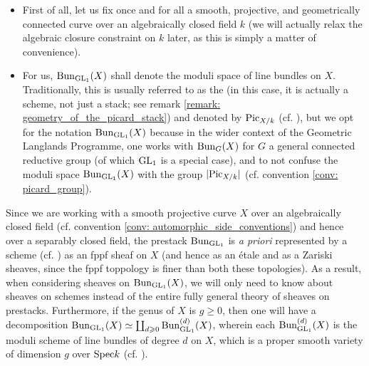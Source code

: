             \begin{convention} \label{conv: automorphic_side_conventions}
                \noindent
                \begin{itemize}
                    \item First of all, let us fix once and for all a smooth, projective, and geometrically connected curve over an algebraically closed field $k$ (we will actually relax the algebraic closure constraint on $k$ later, as this is simply a matter of convenience).
                    \item For us, $\mathrm{Bun}_{\operatorname{GL}_1}(X)$ shall denote the moduli space of line bundles on $X$. Traditionally, this is usually referred to as the  (in this case, it is actually a scheme, not just a stack; see remark \ref{remark: geometry_of_the_picard_stack}) and denoted by $\mathrm{Pic}_{X/k}$ (cf. \cite[\href{https://stacks.math.columbia.edu/tag/0372}{Tag 0372}]{stacks}), but we opt for the notation $\mathrm{Bun}_{\operatorname{GL}_1}(X)$ because in the wider context of the Geometric Langlands Programme, one works with $\mathrm{Bun}_G(X)$ for $G$ a general connected reductive group (of which $\operatorname{GL}_1$ is a special case), and to not confuse the moduli space $\mathrm{Bun}_{\operatorname{GL}_1}(X)$ with the group $|\mathrm{Pic}_{X/k}|$ (cf. convention \ref{conv: picard_group}). 
                \end{itemize}
            \end{convention}
            \begin{remark} \label{remark: geometry_of_the_picard_stack}
                Since we are working with a smooth projective curve $X$ over an algebraically closed field (cf. convention \ref{conv: automorphic_side_conventions}) and hence over a separably closed field, the prestack $\mathrm{Bun}_{\operatorname{GL}_1}$ is \textit{a priori} represented by a scheme (cf. \cite[\href{https://stacks.math.columbia.edu/tag/0B9Z}{Tag 0B9Z}]{stacks}) as an fppf sheaf on $X$ (and hence as an \'etale and as a Zariski sheaves, since the fppf toppology is finer than both these topologies). As a result, when considering sheaves on $\mathrm{Bun}_{\operatorname{GL}_1}(X)$, we will only need to know about sheaves on schemes instead of the entire fully general theory of sheaves on prestacks. Furthermore, if the genus of $X$ is $g \geq 0$, then one will have a decomposition $\mathrm{Bun}_{\operatorname{GL}_1}(X) \simeq \coprod_{d \geqslant 0} \mathrm{Bun}_{\operatorname{GL}_1}^{(d)}(X)$, wherein each $\mathrm{Bun}_{\operatorname{GL}_1}^{(d)}(X)$ is the moduli scheme of line bundles of degree $d$  on $X$, which is a proper smooth variety of dimension $g$ over $\mathrm{Spec} k$ (cf. \cite[\href{https://stacks.math.columbia.edu/tag/0BA0}{Tag 0BA0}]{stacks}).
            \end{remark}
            
